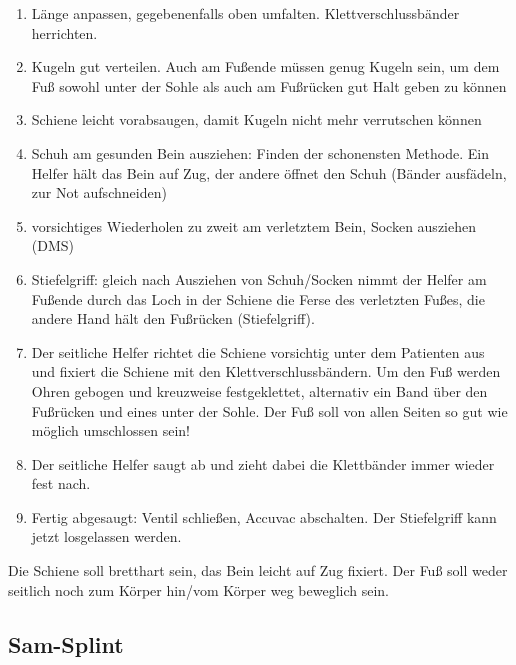 \begin{enumerate}
    \item Länge anpassen, gegebenenfalls oben umfalten.
    Klettverschlussbänder herrichten.
    \item Kugeln gut verteilen. Auch am Fußende müssen genug Kugeln
    sein, um dem Fuß sowohl unter der Sohle als auch am Fußrücken
    gut Halt geben zu können
    \item Schiene leicht vorabsaugen, damit Kugeln nicht mehr verrutschen
    können
    \item Schuh am gesunden Bein ausziehen: Finden der schonensten Methode.
    Ein Helfer hält das Bein auf Zug, der andere öffnet den Schuh
    (Bänder ausfädeln, zur Not aufschneiden)
    \item vorsichtiges Wiederholen zu zweit am verletztem Bein, Socken
    ausziehen (DMS)
    \item Stiefelgriff: gleich nach Ausziehen von Schuh/Socken nimmt der
    Helfer am Fußende durch das Loch in der Schiene die Ferse des
    verletzten Fußes, die andere Hand hält den Fußrücken (Stiefelgriff).
    \item Der seitliche Helfer richtet die Schiene vorsichtig unter dem
    Patienten aus und fixiert die Schiene mit den Klettverschlussbändern.
    Um den Fuß werden Ohren gebogen und kreuzweise festgeklettet, alternativ ein
    Band über den Fußrücken und eines unter der Sohle. Der Fuß soll von allen
    Seiten so gut wie möglich umschlossen sein!
    \item Der seitliche Helfer saugt ab und zieht dabei die Klettbänder
    immer wieder fest nach. 
    \item Fertig abgesaugt: Ventil schließen, Accuvac abschalten. Der
    Stiefelgriff kann jetzt losgelassen werden.
\end{enumerate}

Die Schiene soll bretthart sein, das Bein leicht auf Zug fixiert. Der
Fuß soll weder seitlich noch zum Körper hin/vom Körper weg beweglich sein.



\subsection{Sam-Splint}
\label{topic:sam-splint-anwendung}

